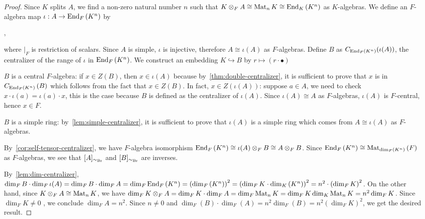  \begin{proof}
   Since $K$ splits $A$, we find a non-zero natural number $n$ such that $K\otimes_{F}A\cong\operatorname{Mat}_{n}K\cong\operatorname{End}_{K}\left(K^{n}\right)$ as $K$-algebras.
   We define an $F$-algebra map $\iota: A\to\operatorname{End}_{F}\left(K^{n}\right)$ by
   \begin{center}
     ,
   \end{center}
   where $|_{F}$ is restriction of scalars. Since $A$ is simple, $\iota$ is injective, therefore $A \cong \iota(A)$ as $F$-algebras. Define $B$ as $C_{\operatorname{End}_{F}\left(K^{n}\right)}(\iota(A))$, the centralizer of the range of $\iota$ in $\operatorname{End}_{F}\left(K^{n}\right)$.
   We construct an embedding $K \hookrightarrow B$ by $r \mapsto (r \cdot \bullet)$

   $B$ is a central $F$-algebra: if $x \in Z(B)$, then $x \in \iota(A)$ because by~\cref{thm:double-centralizer}, it is sufficient to prove that $x$ is in $C_{\operatorname{End}_{F}\left(K^{n}\right)}\left(B\right)$ which follows from the fact that $x \in Z(B)$. In fact, $x \in Z(\iota(A))$: suppose $a \in A$, we need to check $x \cdot \iota(a) = \iota(a)\cdot x$, this is the case because $B$ is defined as the centralizer of $\iota(A)$. Since $\iota(A) \cong A$ as $F$-algebras, $\iota(A)$ is $F$-central, hence $x \in F$.

   $B$ is a simple ring: by~\cref{lem:simple-centralizer}, it is sufficient to prove that $\iota(A)$ is a simple ring which comes from $A \cong \iota(A)$ as $F$-algebras.

   By~\cref{cor:self-tensor-centralizer}, we have $F$-algebra isomorphism $\operatorname{End}_{F}\left(K^{n}\right)\cong \iota(A)\otimes_{F}B \cong A \otimes_{F}B$. Since $\operatorname{End}_{F}\left(K^{n}\right)\cong\operatorname{Mat}_{\dim_{F}\left(K^{n}\right)}\left(F\right)$ as $F$-algebras, we see that $[A]_{\sim_{\operatorname{Br}}}$ and $[B]_{\sim_{\operatorname{Br}}}$ are inverses.

   By~\cref{lem:dim-centralizer}, $\dim_{F}B\cdot \dim_{F}\iota(A) = \dim_{F}B\cdot\dim_{F}A = \dim_{F}\operatorname{End}_{F}\left(K^{n}\right) = {\left(\dim_{F}\left(K^{n}\right)\right)}^{2}={\left(\dim_{F}K\cdot \dim_{K}\left(K^{n}\right)\right)}^{2}=n^{2}\cdot{\left(\dim_{F}K\right)}^{2}$. On the other hand, since $K\otimes_{F}A\cong\operatorname{Mat}_{n}K$, we have $\dim_{F}K\otimes_{F}A=\dim_{F}K\cdot\dim_{F}A=\dim_{F}\operatorname{Mat}_{n}K=\dim_{F}K\dim_{K}\operatorname{Mat}_{n}K=n^{2}\dim_{F}K$. Since $\dim_{F}K\ne 0$ , we conclude $\dim_{F}A=n^{2}$. Since $n\ne 0$ and $\dim_{F}(B)\cdot \dim_{F}(A)=n^{2}\dim_{F}(B)=n^{2}{\left(\dim_{F}K\right)}^{2}$, we get the desired result.

 \end{proof}

